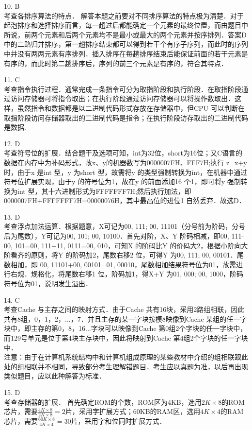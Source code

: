 10. B \\
考查各排序算法的特点．
解答本题之前要对不同排序算法的特点极为清楚．对于起泡排序和选择排序而言，每一趟过后都能确定一个元素的最终位置，而由题目中所说，前两个元素和后两个元素均不是最小或最大的两个元素并按序排列．答案D 中的二路归并排序，第一趟排序结束都可以得到若干个有序子序列，而此时的序列中并没有两两元素有序排列．插入排序在每趟排序结束后能保证前面的若干元素是有序的，而此时第二趟排序后，序列的前三个元素是有序的，符合其特点．

11. C \\
考查指令执行过程．通常完成一条指令可分为取指阶段和执行阶段．在取指阶段通过访问存储器可将指令取出；在执行阶段通过访问存储器可以将操作数取出．这样，虽然指令和数据都是以二进制代码形式存放在存储器中，但CPU 可以判断在取指阶段访问存储器取出的二进制代码是指令；在执行阶段访存取出的二进制代码是数据.

12. D \\
考查符号位的扩展．结合题干及选项可知，int为32位，short为16位；又C语言的数据在内存中为补码形式，故x、y的机器数写为0000007FH、FFF7H;执行 z=x+y 时，由于x 是int 型，y 为short 型，故需将y 的类型强制转换为int，在机器中通过符号位扩展实现，由于y 的符号位为1，故在y 的前面添加16 个1，即可将y 强制转换为int 型，其十六进制形式为FFFFFFF7H;然后执行加法，即0000007FH+FFFFFFF7H=00000076H，其中最高位的进位1 自然丢弃．故选D．

13. D \\
考查浮点加法运算．根据题意，X可记为00, 111; 00, 11101（分号前为阶码，分号后为尾数），Y可记为00, 101; 00, 10100．首先对阶，X、Y 阶码相减，即00, 111-00, 101=00, 111+11, 0111=00, 010，可知X 的阶码比Y 的价码大2，根据小阶向大阶看齐的原则，将Y 的阶码加2，尾数右移2 位，可得Y 为00, 111; 00, 00101．尾数相加，即 00, 11101+00, 00101=01, 00010，尾数相加结果符号位为01，故需进行右规．规格化，将尾数右移1 位，阶码加1，得X+Y 为01, 000; 00, 1000，阶码符号位为01，说明发生溢出．

14. C \\
考查Cache 与主存之间的映射方式．由于Cache 共有16块，采用2路组相联，因此共有8组，0，1，2，...，7．并且主存的某一字块按模8映像到Cache 某组的任一字块中，即主存的第0，8，16...字块可以映像到Cache 第0组2个字块的任一字块中，而129号单元是位于第4块主存块中，因此将映射到Cache 第4组2个字块的任一字块中． \\
注意：由于在计算机系统结构中和计算机组成原理的某些教材中介绍的组相联跟此处的组相联并不相同，导致部分考生理解错题目．考生应以真题为准，以后再出现类似题目，应以此种解答为标准．

15. D \\
考查存储器的扩展．
首先确定ROM的个数，ROM区为4KB，选用$2K\times8$的ROM芯片，需要$\frac{4K\times8}{2K\times8}=2$片，采用字扩展方式；60KB的RAM区，选用$4K\times4$的RAM芯片，需要$\frac{60K\times8}{4K\times4}=30$片，采用字和位同时扩展方式．

